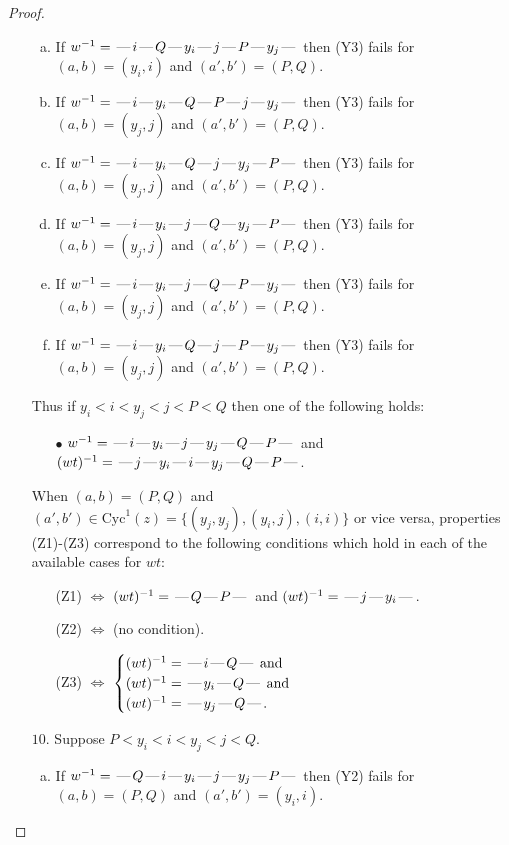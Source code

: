\documentclass[10pt]{article}
\theoremstyle{definition}
\theoremstyle{definition}
\def\dash{\text{\hspace{0.5mm}---\hspace{0.5mm}}}
\def\Cyc{\mathrm{Cyc}}
\begin{document}
\begin{proof}
\begin{enumerate}
\begin{enumerate}[(a)]
\item If $w^{-1} = \dash i\dash Q\dash y_i\dash j\dash P\dash y_j\dash $ then (Y3) fails for $(a,b)=(y_i,i)$ and $(a',b')=(P,Q)$.
\item If $w^{-1} = \dash i\dash y_i\dash Q\dash P\dash j\dash y_j\dash $ then (Y3) fails for $(a,b)=(y_j,j)$ and $(a',b')=(P,Q)$.
\item If $w^{-1} = \dash i\dash y_i\dash Q\dash j\dash y_j\dash P\dash $ then (Y3) fails for $(a,b)=(y_j,j)$ and $(a',b')=(P,Q)$.
\item If $w^{-1} = \dash i\dash y_i\dash j\dash Q\dash y_j\dash P\dash $ then (Y3) fails for $(a,b)=(y_j,j)$ and $(a',b')=(P,Q)$.
\item If $w^{-1} = \dash i\dash y_i\dash j\dash Q\dash P\dash y_j\dash $ then (Y3) fails for $(a,b)=(y_j,j)$ and $(a',b')=(P,Q)$.
\item If $w^{-1} = \dash i\dash y_i\dash Q\dash j\dash P\dash y_j\dash $ then (Y3) fails for $(a,b)=(y_j,j)$ and $(a',b')=(P,Q)$.
\end{enumerate}
Thus if $y_i < i < y_j < j < P < Q$ then one of the following holds:
\begin{enumerate}
\item[$\bullet$] $w^{-1} = \dash i\dash y_i\dash j\dash y_j\dash Q\dash P\dash $ and $(wt)^{-1} = \dash j\dash y_i\dash i\dash y_j\dash Q\dash P\dash $.
\end{enumerate}
When $(a,b)= (P,Q)$ and $(a',b')\in \Cyc^1(z)=\{(y_j,y_j),(y_i,j),(i,i)\}$ or vice versa,
properties (Z1)-(Z3) correspond to the following conditions which
hold in each of the available cases for $wt$:
\begin{enumerate}
\item[](Z1) $\Leftrightarrow$ $(wt)^{-1} = \dash Q \dash P \dash$  and $(wt)^{-1} = \dash j \dash y_i \dash$.
\item[](Z2) $\Leftrightarrow$ (no condition).
\item[](Z3) $\Leftrightarrow$ $\begin{cases}\text{$(wt)^{-1} = \dash i \dash Q \dash$}\text{ and }\\
\text{$(wt)^{-1} = \dash y_i \dash Q \dash$}\text{ and }\\
\text{$(wt)^{-1} = \dash y_j \dash Q \dash$}.\end{cases}$
\end{enumerate}
\item[$10$.] Suppose $P < y_i < i < y_j < j < Q$.
\begin{enumerate}[(a)]
\item If $w^{-1} = \dash Q\dash i\dash y_i\dash j\dash y_j\dash P\dash $ then (Y2) fails for $(a,b)=(P,Q)$ and $(a',b')=(y_i,i)$.

\end{enumerate}
\end{enumerate}
\end{proof}
\end{document}
